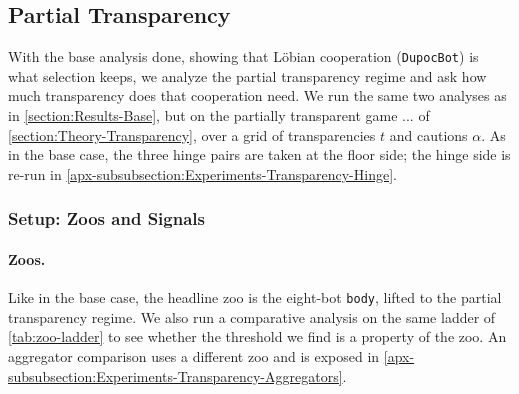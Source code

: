 \documentclass[twoside,11pt]{article}
\begin{document}


\subsection{Partial Transparency}
\label{section:Results-Transparency}
With the base analysis done, showing that Löbian cooperation (\texttt{DupocBot}) is what selection keeps, we analyze the partial transparency regime and ask how much transparency does that cooperation need. We run the same two analyses as in \cref{section:Results-Base}, but on the partially transparent game ... of \cref{section:Theory-Transparency}, over a grid of transparencies $t$ and cautions $\alpha$. As in the base case, the three hinge pairs are taken at the floor side; the hinge side is re-run in \cref{apx-subsubsection:Experiments-Transparency-Hinge}.

\subsubsection{Setup: Zoos and Signals}
\label{subsection:Results-Transparency-Env}

\paragraph{Zoos.} Like in the base case, the headline zoo is the eight-bot \texttt{body}, lifted to the partial transparency regime. We also run a comparative analysis on the same ladder of \cref{tab:zoo-ladder} to see whether the threshold we find is a property of the zoo. An aggregator comparison uses a different zoo and is exposed in \cref{apx-subsubsection:Experiments-Transparency-Aggregators}.
\end{document}
